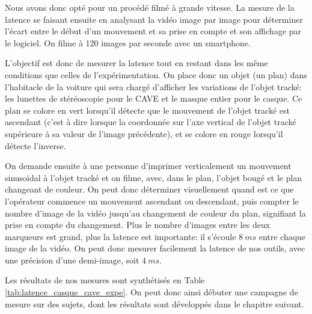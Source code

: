 	\par Nous avons donc opté pour un procédé filmé à grande vitesse. La mesure de la latence se faisant ensuite en analysant la vidéo image par image pour déterminer l'écart entre le début d'un mouvement et sa prise en compte et son affichage par le logiciel. On filme à 120 images par seconde avec un smartphone.
	
	\par L'objectif est donc de mesurer la latence tout en restant dans les même conditions que celles de l'expérimentation. On place donc un objet (un plan) dans l'habitacle de la voiture qui sera chargé d'afficher les variations de l'objet tracké: les lunettes de stéréoscopie pour le CAVE et le masque entier pour le casque. Ce plan se colore en vert lorsqu'il détecte que le mouvement de l'objet tracké est ascendant (c'est à dire lorsque la coordonnée sur l'axe vertical de l'objet tracké supérieure à sa valeur de l'image précédente), et se colore en rouge lorsqu'il détecte l'inverse.
	
	\par On demande ensuite à une personne d'imprimer verticalement un mouvement sinusoïdal à l'objet tracké et on filme, avec, dans le plan, l'objet bougé et le plan changeant de couleur. On peut donc déterminer visuellement quand est ce que l'opérateur commence un mouvement ascendant ou descendant, puis compter le nombre d'image de la vidéo jusqu'au changement de couleur du plan, signifiant la prise en compte du changement. Plus le nombre d'images entre les deux marqueurs est grand, plus la latence est importante: il s'écoule $8~ms$ entre chaque image de la vidéo. On peut donc mesurer facilement la latence de nos outils, avec une précision d'une demi-image, soit $4~ms$.
	
	\par Les résultats de nos mesures sont synthétisés en Table \ref{tab:latence_casque_cave_expe}. On peut donc ainsi débuter une campagne de mesure sur des sujets, dont les résultats sont développés dans le chapitre suivant.
	
